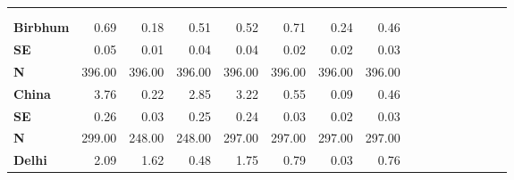 \begin{tabular}{@{\extracolsep{5pt}}lrrrrrrrrrrrrrrr}
\toprule
&  &  &  &  &  &  &  \\
{\bf } &  &  &  &  &  &  &  \\
\hline
{\bf Birbhum} & 0.69\phantom{***} & 0.18\phantom{***} & 0.51\phantom{***} & 0.52\phantom{***} & 0.71\phantom{***} & 0.24\phantom{***} & 0.46\phantom{***} \\
{\bf SE} & 0.05\phantom{***} & 0.01\phantom{***} & 0.04\phantom{***} & 0.04\phantom{***} & 0.02\phantom{***} & 0.02\phantom{***} & 0.03\phantom{***} \\
{\bf N} & 396.00\phantom{***} & 396.00\phantom{***} & 396.00\phantom{***} & 396.00\phantom{***} & 396.00\phantom{***} & 396.00\phantom{***} & 396.00\phantom{***} \\
{\bf China} & 3.76\phantom{***} & 0.22\phantom{***} & 2.85\phantom{***} & 3.22\phantom{***} & 0.55\phantom{***} & 0.09\phantom{***} & 0.46\phantom{***} \\
{\bf SE} & 0.26\phantom{***} & 0.03\phantom{***} & 0.25\phantom{***} & 0.24\phantom{***} & 0.03\phantom{***} & 0.02\phantom{***} & 0.03\phantom{***} \\
{\bf N} & 299.00\phantom{***} & 248.00\phantom{***} & 248.00\phantom{***} & 297.00\phantom{***} & 297.00\phantom{***} & 297.00\phantom{***} & 297.00\phantom{***} \\
{\bf Delhi} & 2.09\phantom{***} & 1.62\phantom{***} & 0.48\phantom{***} & 1.75\phantom{***} & 0.79\phantom{***} & 0.03\phantom{***} & 0.76\phantom{***} \\

\end{tabular}
